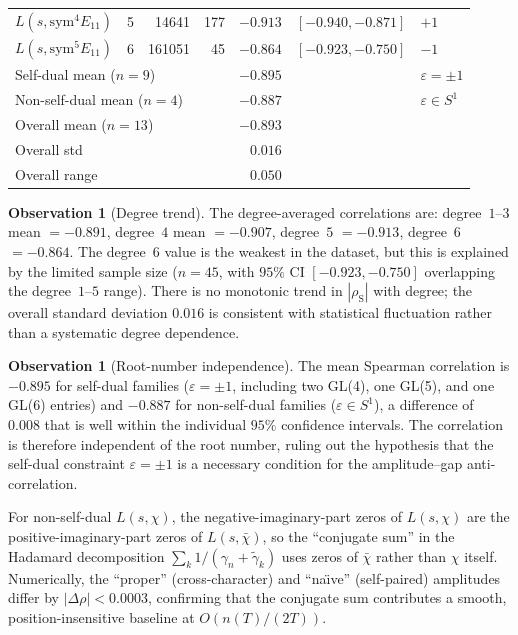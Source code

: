 \documentclass[11pt,a4paper]{article}
\theoremstyle{plain}
\theoremstyle{definition}
\newtheorem{observation}[theorem]{Observation}
\begin{document}
\begin{table}[h]
\begin{tabular}{llrrrll}
$L(s,\mathrm{sym}^4 E_{11})$ & 5 & 14641 & 177 & $-0.913$ & $[-0.940,-0.871]$ & $+1$ \\
$L(s,\mathrm{sym}^5 E_{11})$ & 6 & 161051 & 45 & $-0.864$ & $[-0.923,-0.750]$ & $-1$ \\
\midrule
\multicolumn{3}{l}{Self-dual mean ($n = 9$)} & & $-0.895$ & & $\varepsilon = \pm 1$ \\
\multicolumn{3}{l}{Non-self-dual mean ($n = 4$)} & & $-0.887$ & & $\varepsilon \in S^1$ \\
\multicolumn{3}{l}{Overall mean ($n = 13$)} & & $-0.893$ & & \\
\multicolumn{3}{l}{Overall std} & & $0.016$ & & \\
\multicolumn{3}{l}{Overall range} & & $0.050$ & & \\
\bottomrule
\end{tabular}
\end{table}

\begin{observation}[Degree trend]\label{obs:degree_trend}
The degree-averaged correlations are: degree~$1$--$3$ mean $= -0.891$,
degree~$4$ mean $= -0.907$, degree~$5$ $= -0.913$,
degree~$6$ $= -0.864$.  The degree~$6$ value is the weakest in the
dataset, but this is explained by the limited sample size ($n = 45$,
with $95\%$ CI $[-0.923, -0.750]$ overlapping the degree~$1$--$5$ range).
There is no monotonic trend in $|\rho_{\mathrm{S}}|$ with degree;
the overall standard deviation $0.016$ is consistent with statistical
fluctuation rather than a systematic degree dependence.
\end{observation}

\begin{observation}[Root-number independence]\label{obs:root_number}
The mean Spearman correlation is $-0.895$ for self-dual families
($\varepsilon = \pm 1$, including two GL(4), one GL(5), and one GL(6) entries)
and $-0.887$ for non-self-dual families
($\varepsilon \in S^1$), a difference of~$0.008$ that is well
within the individual $95\%$ confidence intervals.
The correlation is therefore independent of the root number,
ruling out the hypothesis that the self-dual constraint
$\varepsilon = \pm 1$ is a necessary condition for the
amplitude--gap anti-correlation.

\smallskip\noindent
For non-self-dual $L(s,\chi)$, the negative-imaginary-part zeros
of $L(s,\chi)$ are the positive-imaginary-part zeros of $L(s,\bar{\chi})$,
so the ``conjugate sum'' in the Hadamard decomposition
$\sum_k 1/(\gamma_n + \tilde{\gamma}_k)$ uses zeros of $\bar{\chi}$
rather than $\chi$ itself.
Numerically, the ``proper'' (cross-character) and ``na\"{\i}ve''
(self-paired) amplitudes differ by $|\Delta\rho| < 0.0003$,
confirming that the conjugate sum contributes a smooth,
position-insensitive baseline at $O(n(T)/(2T))$.
\end{observation}
\end{document}
